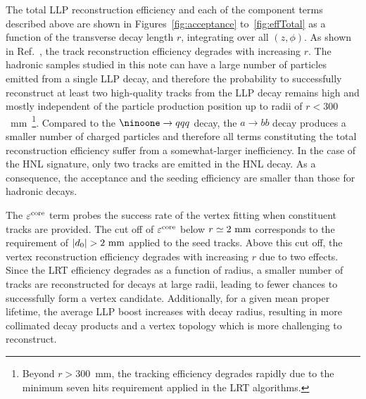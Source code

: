 \documentclass[PUB,UKenglish, texlive=2018]{\ATLASLATEXPATH atlasdoc}
\begin{document}
The total LLP reconstruction efficiency and each of the component terms described above are shown in Figures~\ref{fig:acceptance} to~\ref{fig:effTotal} as a function of the transverse decay length $r$, integrating over all $(z,\phi)$.
As shown in Ref.~\cite{ATL-PHYS-PUB-2017-014}, the track reconstruction efficiency degrades with increasing $r$.
The hadronic samples studied in this note can have a large number of particles emitted from a single LLP decay, 
and therefore the probability to successfully reconstruct at least two high-quality tracks from the LLP decay remains high and mostly independent of the particle production position up to radii of $r<300$~mm~\footnote{
Beyond $r>300$~mm, the tracking efficiency degrades rapidly due to the minimum seven hits requirement applied in the LRT algorithms.}.
Compared to the ${\ninoone} \rightarrow qqq$ decay, the $a \rightarrow bb$ decay produces a smaller number of charged particles and therefore all terms constituting the total reconstruction efficiency suffer from a somewhat-larger inefficiency.
In the case of the HNL signature, only two tracks are emitted in the HNL decay. %
As a consequence, the acceptance and the seeding efficiency are smaller than those for hadronic decays.

The $\varepsilon^{\rm core}$ term probes the success rate of the vertex fitting when constituent tracks are provided.
The cut off of $\varepsilon^{\rm core}$ below $r\simeq 2~{\rm mm}$ corresponds to the requirement of $|d_{0}| > 2~{\rm mm}$ applied to the seed tracks.  Above this cut off, the vertex reconstruction efficiency degrades with increasing $r$ due to two effects. 
Since the LRT efficiency degrades as a function of radius, a smaller number of tracks are reconstructed for decays at large radii, leading to fewer chances to successfully form a vertex candidate.  Additionally, for a given mean proper lifetime, the average LLP boost increases with decay radius, resulting in more collimated decay products and a vertex topology which is more challenging to reconstruct.
\end{document}

